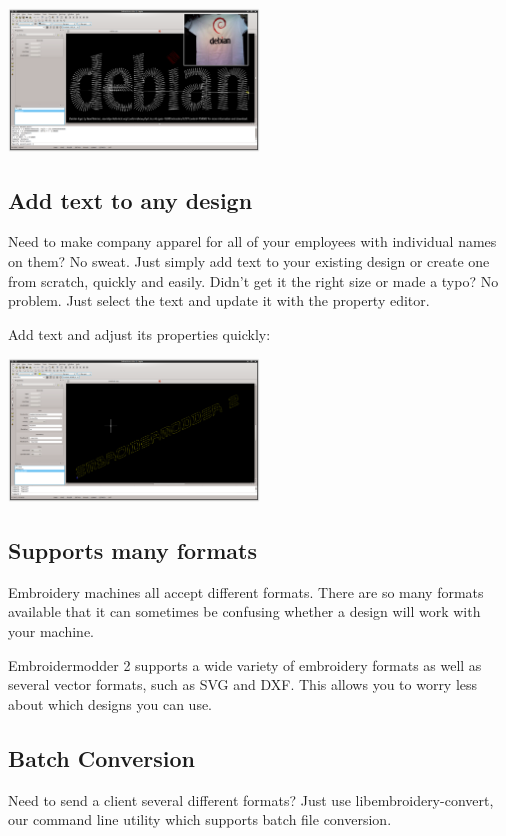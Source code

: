 \documentclass[11pt]{report}
\begin{document}
\includegraphics[width=0.5\textwidth]{images/features-measure-1.png}

\subsection{Add text to any design}

Need to make company apparel for all of your employees with individual names on them? No sweat.
Just simply add text to your existing design or create one from scratch, quickly and easily.
Didn't get it the right size or made a typo? No problem. Just select the text and update it
with the property editor.

Add text and adjust its properties quickly:

\includegraphics[width=0.5\textwidth]{images/features-text-1.png}

\subsection{Supports many formats}

Embroidery machines all accept different formats. There are so many formats
available that it can sometimes be confusing whether a design will work with your machine.

Embroidermodder 2 supports a wide variety of embroidery formats as well as several vector
formats, such as SVG and DXF. This allows you to worry less about which designs you can use.

\subsection{Batch Conversion}

Need to send a client several different formats? Just use libembroidery-convert, our command
line utility which supports batch file conversion.
\end{document}
